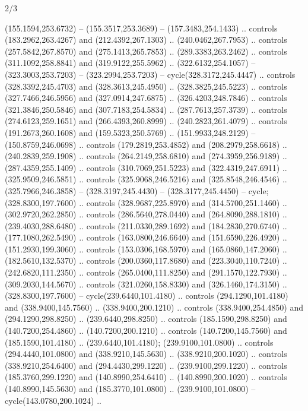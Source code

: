 \begin{flagdescription}{2/3}
\begin{scope}[yshift=0.5\flagwidth,xshift=0.4\flaglength,y=0.00183\flagwidth,x=0.00183\flagwidth,yscale=-1,inner sep=0pt,outer sep=0pt]
\begin{scope}[xshift=-0.517\flagwidth,yshift=-0.285\flagwidth]
\begin{scope}[cm={{1.42403,0.0,0.0,1.42403,(-59.10036,-127.66903)}},draw=black,fill=gold,line join=round,line cap=round,even odd rule,line width=0.0015\flagwidth]
  (155.1594,253.6732) -- (155.3517,253.3689) -- (157.3483,254.1433) .. controls
  (183.2962,263.4267) and (212.4392,267.1303) .. (240.0462,267.7953) .. controls
  (257.5842,267.8570) and (275.1413,265.7853) .. (289.3383,263.2462) .. controls
  (311.1092,258.8841) and (319.9122,255.5962) .. (322.6132,254.1057) --
  (323.3003,253.7203) -- (323.2994,253.7203) -- cycle(328.3172,245.4447) ..
  controls (328.3392,245.4703) and (328.3613,245.4950) .. (328.3825,245.5223) ..
  controls (327.7466,246.5956) and (327.0914,247.6875) .. (326.4203,248.7846) ..
  controls (321.3846,250.5846) and (307.7183,254.5834) .. (287.7613,257.3739) ..
  controls (274.6123,259.1651) and (266.4393,260.8999) .. (240.2823,261.4079) ..
  controls (191.2673,260.1608) and (159.5323,250.5769) .. (151.9933,248.2129) --
  (150.8759,246.0698) .. controls (179.2819,253.4852) and (208.2979,258.6618) ..
  (240.2839,259.1908) .. controls (264.2149,258.6810) and (274.3959,256.9189) ..
  (287.4359,255.1409) .. controls (310.7069,251.5223) and (322.4319,247.6911) ..
  (325.9509,246.5851) .. controls (325.9068,246.5216) and (325.8548,246.4546) ..
  (325.7966,246.3858) -- (328.3197,245.4430) -- (328.3177,245.4450) -- cycle;
 (328.8300,197.7600) .. controls (328.9687,225.8970) and
  (314.5700,251.1460) .. (302.9720,262.2850) .. controls (286.5640,278.0440) and
  (264.8090,288.1810) .. (239.4030,288.6480) .. controls (211.0330,289.1692) and
  (184.2830,270.6740) .. (177.1080,262.5490) .. controls (163.0800,246.6640) and
  (151.6590,226.4920) .. (151.2930,199.3060) .. controls (153.0306,168.5970) and
  (165.0860,147.2060) .. (182.5610,132.5370) .. controls (200.0360,117.8680) and
  (223.3040,110.7240) .. (242.6820,111.2350) .. controls (265.0400,111.8250) and
  (291.1570,122.7930) .. (309.2030,144.5670) .. controls (321.0260,158.8330) and
  (326.1460,174.3150) .. (328.8300,197.7600) -- cycle(239.6440,101.4180) ..
  controls (294.1290,101.4180) and (338.9400,145.7560) .. (338.9400,200.1210) ..
  controls (338.9400,254.4850) and (294.1290,298.8250) .. (239.6440,298.8250) ..
  controls (185.1590,298.8250) and (140.7200,254.4860) .. (140.7200,200.1210) ..
  controls (140.7200,145.7560) and (185.1590,101.4180) .. (239.6440,101.4180);
 (239.9100,101.0800) .. controls (294.4440,101.0800) and
  (338.9210,145.5630) .. (338.9210,200.1020) .. controls (338.9210,254.6400) and
  (294.4430,299.1220) .. (239.9100,299.1220) .. controls (185.3760,299.1220) and
  (140.8990,254.6410) .. (140.8990,200.1020) .. controls (140.8990,145.5630) and
  (185.3770,101.0800) .. (239.9100,101.0800) -- cycle(143.0780,200.1024) ..

\end{scope}
\end{scope}
\end{scope}
\end{flagdescription}
